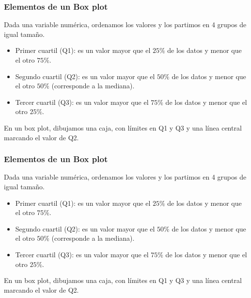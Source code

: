 \documentclass[aspectratio=169,12pt]{beamer}
\begin{document}

\begin{frame}
\frametitle{Elementos de un Box plot}

Dada una variable numérica, ordenamos los valores y los partimos en 4 grupos de igual tamaño.

\begin{itemize}
\item Primer cuartil (Q1): es un valor mayor que el $25\%$ de los datos y menor que el otro $75\%$.
\item Segundo cuartil (Q2): es un valor mayor que el $50\%$ de los datos y menor que el otro $50\%$ (corresponde a la mediana).
\item Tercer cuartil (Q3): es un valor mayor que el $75\%$ de los datos y menor que el otro $25\%$.
\end{itemize}

En un box plot, dibujamos una caja, con límites en Q1 y Q3 y una línea central marcando el valor de Q2.

\end{frame}


\begin{frame}
\frametitle{Elementos de un Box plot}

Dada una variable numérica, ordenamos los valores y los partimos en 4 grupos de igual tamaño.

\begin{itemize}
\item Primer cuartil (Q1): es un valor mayor que el $25\%$ de los datos y menor que el otro $75\%$.
\item Segundo cuartil (Q2): es un valor mayor que el $50\%$ de los datos y menor que el otro $50\%$ (corresponde a la mediana).
\item Tercer cuartil (Q3): es un valor mayor que el $75\%$ de los datos y menor que el otro $25\%$.
\end{itemize}

En un box plot, dibujamos una caja, con límites en Q1 y Q3 y una línea central marcando el valor de Q2.

\end{frame}

\end{document}
